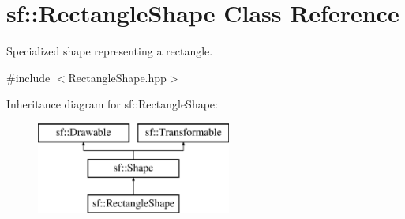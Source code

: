 \hypertarget{classsf_1_1RectangleShape}{\section{sf\-:\-:Rectangle\-Shape Class Reference}
\label{classsf_1_1RectangleShape}
}


Specialized shape representing a rectangle.  




{\ttfamily \#include $<$Rectangle\-Shape.\-hpp$>$}

Inheritance diagram for sf\-:\-:Rectangle\-Shape\-:\begin{figure}[H]
\begin{center}
\leavevmode
\includegraphics[height=3.000000cm]{classsf_1_1RectangleShape}
\end{center}
\end{figure}
